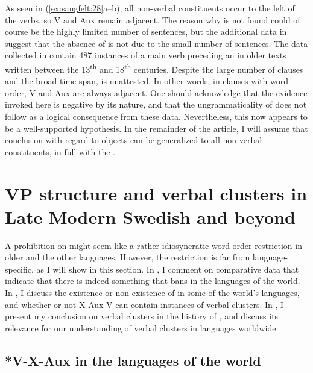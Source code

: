 \documentclass[output=paper, colorlinks, citecolor=brown]{langscibook}
\begin{document}
As seen in (\ref{ex:sangfelt:28}a–b), all non-verbal constituents occur to the left of the verbs, so V and Aux remain adjacent. The reason why  is not found could of course be the highly limited number of sentences, but the additional data in \citet{Sangfelt2019} suggest that the absence of  is not due to the small number of sentences. The data collected in \citet[133]{Sangfelt2019} contain 487 instances of a main verb preceding an  in older  texts written between the 13\textsuperscript{th} and 18\textsuperscript{th} centuries. Despite the large number of clauses and the broad time span,  is unattested. In other words, in clauses with  word order, V and Aux are always adjacent. One should acknowledge that the evidence invoked here is negative by its nature, and that the ungrammaticality of  does not follow as a logical consequence from these data. Nevertheless, this now appears to be a well-supported hypothesis. In the remainder of the article, I will assume that  conclusion with regard to objects can be generalized to all non-verbal constituents, in full  with the .

\section{VP structure and verbal clusters in Late Modern Swedish and beyond}\label{sec:sangfelt:5}

A prohibition on  might seem like a rather idiosyncratic word order restriction in older  and the other  languages. However, the restriction is far from language-specific, as I will show in this section. In , I comment on comparative data that indicate that there is indeed something that bans  in the languages of the world. In , I discuss the existence or non-existence of  in some of the world’s languages, and whether or not X-Aux-V can contain instances of verbal clusters. In , I present my conclusion on verbal clusters in the history of , and discuss its relevance for our understanding of verbal clusters in languages worldwide.

\subsection{*V-X-Aux in the languages of the world}\label{sec:sangfelt:5.1}
\end{document}
